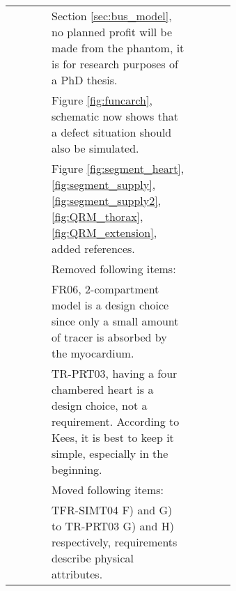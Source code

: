 {\begin{longtable}{|c|p{0.64\linewidth}|l|}
		 	& \hspace{0.5cm} \textbullet Section \ref{sec:bus_model}, no planned profit will be made from the phantom, it is for research purposes of a PhD thesis. & \\
		 	& \hspace{0.5cm} \textbullet Figure \ref{fig:funcarch}, schematic now shows that a defect situation should also be simulated. & \\
		 	& \hspace{0.5cm} \textbullet Figure \ref{fig:segment_heart}, \ref{fig:segment_supply}, \ref{fig:segment_supply2}, \ref{fig:QRM_thorax}, \ref{fig:QRM_extension}, added references. & \\
		 	& Removed following items: & \\
		 	& \hspace{0.5cm} \textbullet FR06, 2-compartment model is a design choice since only a small amount of tracer is absorbed by the myocardium. & \\
		 	& \hspace{0.5cm} \textbullet TR-PRT03, having a four chambered heart is a design choice, not a requirement. According to Kees, it is best to keep it simple, especially in the beginning. & \\
		 	& Moved following items: & \\
		 	& TFR-SIMT04 F) and G) to TR-PRT03 G) and H) respectively, requirements describe physical attributes. & \\
		\hline
\end{longtable}
}


